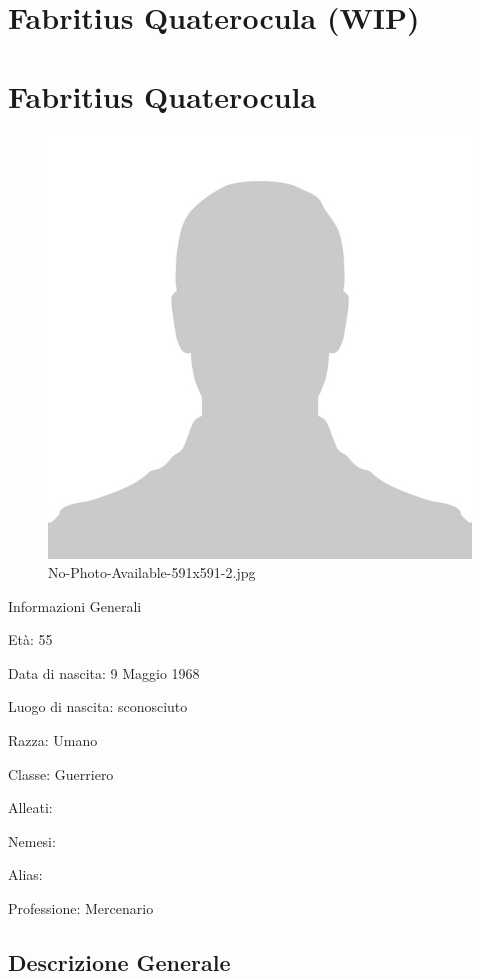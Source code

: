 \section{Fabritius Quaterocula (WIP)}\label{fabritius-quaterocula-wip}
\section{Fabritius Quaterocula}\label{fabritius-quaterocula}


\begin{figure}
\centering
\includegraphics{No-Photo-Available-591x591-2.jpg}
\caption{No-Photo-Available-591x591-2.jpg}
\end{figure}

Informazioni Generali

Età: 55

Data di nascita: 9 Maggio 1968

Luogo di nascita: sconosciuto

Razza: Umano

Classe: Guerriero

Alleati:

Nemesi:

Alias:

Professione: Mercenario


\subsection{Descrizione Generale}\label{descrizione-generale}


